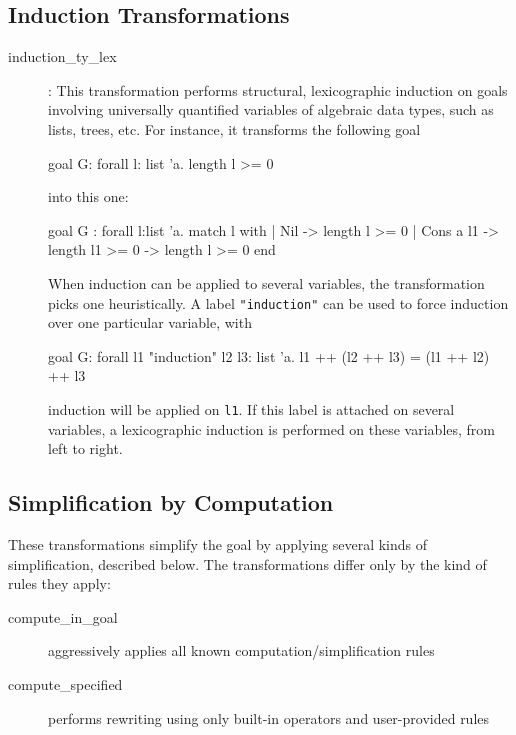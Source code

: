 \subsection{Induction Transformations}

\begin{description}
\item[induction\_ty\_lex]:
  This transformation performs structural, lexicographic induction on
  goals involving universally quantified variables of algebraic data
  types, such as lists, trees, etc. For instance, it transforms the
  following goal
\begin{whycode}
goal G: forall l: list 'a. length l >= 0
\end{whycode}
  into this one:
\begin{whycode}
goal G :
  forall l:list 'a.
     match l with
     | Nil -> length l >= 0
     | Cons a l1 -> length l1 >= 0 -> length l >= 0
     end
\end{whycode}
  When induction can be applied to several variables, the transformation
  picks one heuristically. A label \verb|"induction"| can be used to
  force induction over one particular variable, \eg with
\begin{whycode}
goal G: forall l1 "induction" l2 l3: list 'a.
        l1 ++ (l2 ++ l3) = (l1 ++ l2) ++ l3
\end{whycode}
induction will be applied on \verb|l1|. If this label is attached on
several variables, a lexicographic induction is performed on these
variables, from left to right.




\end{description}

\subsection{Simplification by Computation}

These transformations simplify the goal by applying several kinds of
simplification, described below. The transformations differ only by
the kind of rules they apply:
\begin{description}
\item[compute\_in\_goal] aggressively applies all known
  computation/simplification rules

\item[compute\_specified] performs rewriting using only built-in
  operators and user-provided rules
\end{description}

